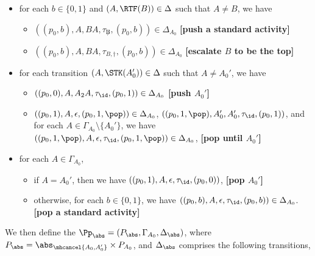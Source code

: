 \begin{itemize}
\begin{itemize}
        \end{itemize}
    \item for each $b\in\{0,1\}$ and $(A, \RTF(B)) \in \Delta$ such that $A \neq B$, we have 
        \begin{itemize}
            \item $((p_0,b), A, BA, \tau_{\not B}, (p_0,b)) \in \Delta_{A_0}$ \textbf{[push a standard activity]}
            \item $((p_0,b), A, BA, \tau_{B, \dag}, (p_0,b)) \in \Delta_{A_0}$ \textbf{[escalate $B$ to be the top]}
        \end{itemize}
    \item for each transition $(A,\STK(A_0'))\in\Delta$ such that $A\neq A_0'$, we have 
        \begin{itemize}
            \item $((p_0,0),A,A_2A,\tau_{\id},(p_0,1))\in\Delta_{A_0}$ \textbf{[push $A_0'$]}
            \item $((p_0,1),A,\epsilon,(p_0,1,\pop))\in\Delta_{A_0}$, $((p_0,1,\pop),A_0',A_0',\tau_{\id},(p_0,1))$, and for each $A\in\Gamma_{A_0}\setminus\{A_0'\}$, we have $((p_0,1,\pop),A,\epsilon,\tau_{\id},(p_0,1,\pop))\in\Delta_{A_0}$, \textbf{[pop until $A_0'$]}
        \end{itemize}
    \item for each $A\in\Gamma_{A_0}$, 
        \begin{itemize}
            \item if $A=A_0'$, then we have $((p_0,1),A,\epsilon,\tau_{\id},(p_0,0))$, \textbf{[pop $A_0'$]}
            \item otherwise, for each $b\in\{0,1\}$, we have $((p_0,b),A,\epsilon,\tau_{\id},(p_0,b))\in\Delta_{A_0}$. \textbf{[pop a standard activity]}
        \end{itemize}
\end{itemize}
We then define the {\WOTrPDS} $\Pp_{\abs} = (P_{\abs},\Gamma_{A_0},\Delta_{\abs})$, where $P_{\abs} = \abs_{\mhcancel{A_0,A_0'}}\times P_{A_0}$, and $\Delta_{\abs}$ comprises the following transitions,
